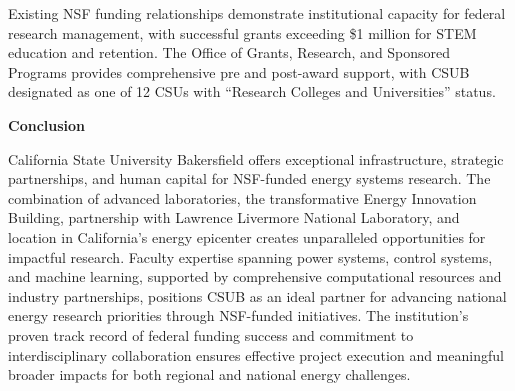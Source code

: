 \documentclass[11pt]{article}
\begin{document}
Existing NSF funding relationships demonstrate institutional capacity for federal research management, with successful grants exceeding \$1 million for STEM education and retention. The Office of Grants, Research, and Sponsored Programs provides comprehensive pre and post-award support, with CSUB designated as one of 12 CSUs with ``Research Colleges and Universities'' status.

\textbf{Conclusion}

California State University Bakersfield offers exceptional infrastructure, strategic partnerships, and human capital for NSF-funded energy systems research. The combination of advanced laboratories, the transformative Energy Innovation Building, partnership with Lawrence Livermore National Laboratory, and location in California's energy epicenter creates unparalleled opportunities for impactful research. Faculty expertise spanning power systems, control systems, and machine learning, supported by comprehensive computational resources and industry partnerships, positions CSUB as an ideal partner for advancing national energy research priorities through NSF-funded initiatives. The institution's proven track record of federal funding success and commitment to interdisciplinary collaboration ensures effective project execution and meaningful broader impacts for both regional and national energy challenges.
\end{document}
